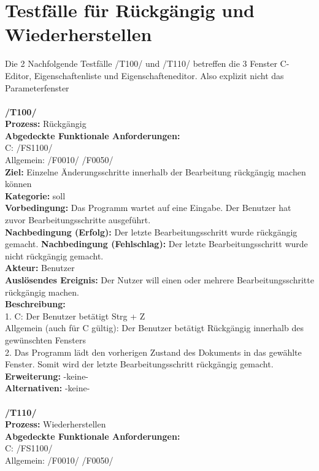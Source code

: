 \documentclass[a4paper]{scrreprt}
\begin{document}
\section{Testfälle für Rückgängig und Wiederherstellen}
Die 2 Nachfolgende Testfälle /T100/ und /T110/ betreffen die 3 Fenster C-Editor, Eigenschaftenliste und Eigenschafteneditor. Also explizit nicht das Parameterfenster \\\\
\textbf{/T100/} \\ 
\textbf{Prozess: }Rückgängig \\
\textbf{Abgedeckte Funktionale Anforderungen:}\\
C: /FS1100/ \\
Allgemein: /F0010/ /F0050/ \\
\textbf{Ziel:} Einzelne Änderungsschritte innerhalb der Bearbeitung rückgängig machen können\\
\textbf{Kategorie:} soll\\
\textbf{Vorbedingung:} Das Programm wartet auf eine Eingabe. Der Benutzer hat zuvor Bearbeitungsschritte ausgeführt. \\
\textbf{Nachbedingung (Erfolg):} Der letzte Bearbeitungsschritt wurde rückgängig gemacht.
\textbf{Nachbedingung (Fehlschlag):} Der letzte Bearbeitungsschritt wurde nicht rückgängig gemacht.\\
\textbf{Akteur:} Benutzer\\
\textbf{Auslösendes Ereignis:} Der Nutzer will einen oder mehrere Bearbeitungsschritte rückgängig machen.\\
\textbf{Beschreibung:} \\
1. C: Der Benutzer betätigt Strg + Z \\
Allgemein (auch für C gültig): Der Benutzer betätigt Rückgängig innerhalb des gewünschten Fensters\\
2. Das Programm lädt den vorherigen Zustand des Dokuments in das gewählte Fenster. Somit wird der letzte Bearbeitungsschritt rückgängig gemacht. \\
\textbf {Erweiterung:} -keine- \\
\textbf {Alternativen:} -keine- \\\\
\textbf{/T110/} \\ 
\textbf{Prozess: }Wiederherstellen \\
\textbf{Abgedeckte Funktionale Anforderungen:}\\
C: /FS1100/ \\
Allgemein: /F0010/ /F0050/ \\
\end{document}
